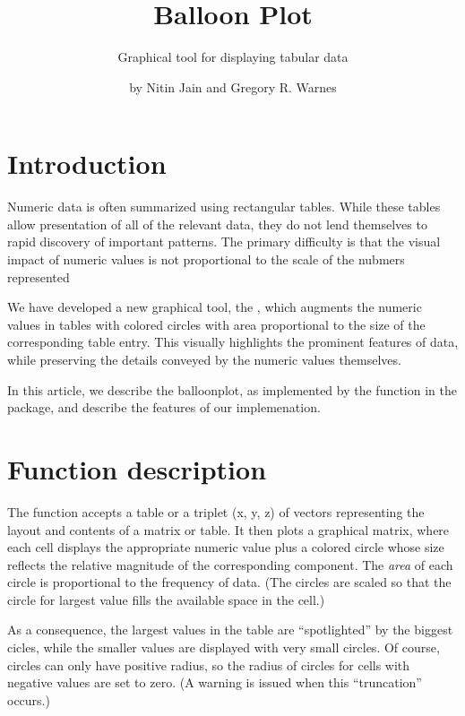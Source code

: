 \documentclass[a4paper]{report}
\begin{document}
\begin{article}
\author{by Nitin Jain and Gregory R. Warnes}
\title{Balloon Plot}
\subtitle{Graphical tool for displaying tabular data}

\maketitle

\section*{Introduction}

Numeric data is often summarized using rectangular tables. While
these tables allow presentation of all of the relevant data, they do
not lend themselves to rapid discovery of important patterns. The
primary difficulty is that the visual impact of numeric values is
not proportional to the scale of the nubmers represented

We have developed a new graphical tool, the ,
which augments the numeric values in tables with colored circles
with area proportional to the size of the corresponding table
entry. This visually highlights the prominent features of
data, while preserving the details conveyed by the numeric values
themselves.

In this article, we describe the balloonplot, as
implemented by the  function in the
 package, and describe the features of our
implemenation.


\section*{Function description}

The function  accepts a table or a triplet (x,
y, z) of vectors representing the layout and contents of a matrix or
table.  It then plots a graphical matrix, where each cell displays
the appropriate numeric value plus a colored circle whose size
reflects the relative magnitude of the corresponding component. The
\emph{area} of each circle is proportional to the frequency of
data. (The circles are scaled so that the circle for largest value
fills the available space in the cell.)

As a consequence, the largest values in the table are ``spotlighted''
by the biggest cicles, while the smaller values are displayed
with very small circles.  Of course, circles can only have positive
radius, so the radius of circles for cells with negative values are
set to zero.  (A warning is issued when this ``truncation'' occurs.)


\end{article}
\end{document}
